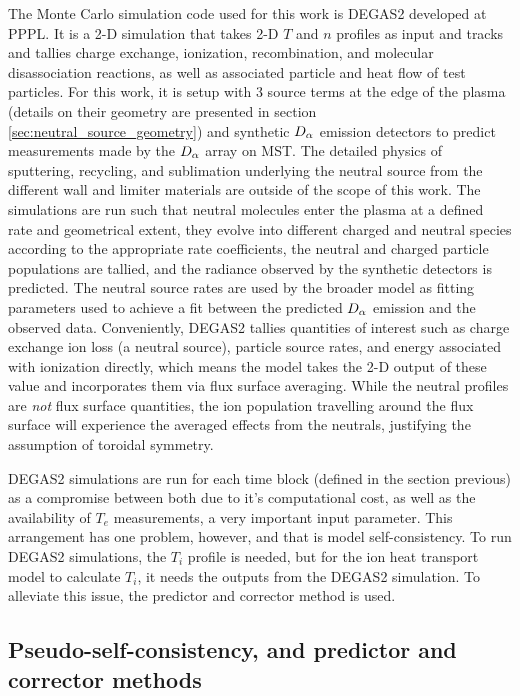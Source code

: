 The Monte Carlo simulation code used for this work is DEGAS2 developed at PPPL\cite{Stotler}. It is a 2-D simulation that takes 2-D $T$ and $n$ profiles as input and tracks and tallies charge exchange, ionization, recombination, and molecular disassociation reactions, as well as associated particle and heat flow of test particles. For this work, it is setup with 3 source terms at the edge of the plasma (details on their geometry are presented in section \ref{sec:neutral_source_geometry}) and synthetic $D_{\alpha}$ emission detectors to predict measurements made by the $D_{\alpha}$ array on MST. The detailed physics of sputtering, recycling, and sublimation underlying the neutral source from the different wall and limiter materials are outside of the scope of this work. The simulations are run such that neutral molecules enter the plasma at a defined rate and geometrical extent, they evolve into different charged and neutral species according to the appropriate rate coefficients, the neutral and charged particle populations are tallied, and the radiance observed by the synthetic detectors is predicted. The neutral source rates are used by the broader model as fitting parameters used to achieve a fit between the predicted $D_{\alpha}$ emission and the observed data. Conveniently, DEGAS2 tallies quantities of interest such as charge exchange ion loss (a neutral source), particle source rates, and energy associated with ionization directly, which means the model takes the 2-D output of these value and incorporates them via flux surface averaging. While the neutral profiles are \textit{not} flux surface quantities, the ion population travelling around the flux surface will experience the averaged effects from the neutrals, justifying the  assumption of toroidal symmetry.

DEGAS2 simulations are run for each time block (defined in the section previous) as a compromise between both due to  it's computational cost, as well as the availability of $T_e$ measurements, a very important input parameter. This arrangement has one problem, however, and that is model self-consistency. To run DEGAS2 simulations, the $T_i$ profile is needed, but for the ion heat transport model to calculate $T_i$, it needs the outputs from the DEGAS2 simulation. To alleviate this issue, the predictor and corrector method is used.

\subsection{Pseudo-self-consistency, and predictor and corrector methods}\label{sec:predictor_and_corrector}


